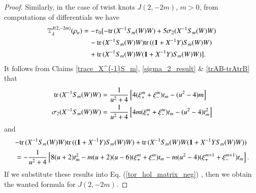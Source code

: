\documentclass[a4paper]{amsart}
\theoremstyle{plain}
\theoremstyle{definition}
\theoremstyle{remark}
\newtheorem{remark}{Remark}%
\newcommand{\I}{\mathbf{1}}
\newcommand{\trace}{{\rm tr}\,}
\begin{document}
\begin{proof}
Similarly, in the case of twist knots $J(2, -2m)$, $m>0$, from computations of differentials we have 
\begin{align}
{\mathbb T}^{J(2, -2m)}_{\lambda}(\rho_u)
&=
-\tau_0[
-\trace(X^{-1}S_m(W)W)+5\sigma_2(X^{-1}S_m(W)W) \label{tor_hol_matrix_neg}\\
& \quad
-\trace(X^{-1}S_m(W)W) \trace((\I+X^{-1}Y)S_m(W)W) \nonumber \\
&\quad
+\trace(X^{-1}S_m(W)W(\I+X^{-1}Y)S_m(W)W) ] \nonumber.
\end{align}
It follows from Claims \ref{trace_X^{-1}S_m}, \ref{sigma_2_result} \& \ref{trAB-trAtrB} that
%
\begin{align*}
\trace(X^{-1}S_m(W)W)
&=
\frac{1}{u^2+4}
\left[
4(\xi_{+}^m + \xi_{-}^m)t_m - (u^2-4)m
\right] \\
\sigma_2(X^{-1}S_m(W)W) 
&=
\frac{1}{u^2+4}
\left[
4m(\xi_{+}^m + \xi_{-}^m)t_m - (u^2 - 4)t^2_m
\right]
\end{align*}
and 
\begin{align*}
\lefteqn{
-\trace(X^{-1}S_m(W)W)\trace((\I+X^{-1}Y)S_m(W)W)
+\trace(X^{-1}S_m(W)W(\I+X^{-1}YS_m(W)W))
}& \\
&=
-\frac{1}{u^2+4}
\left[
8(u+2)t^2_m 
-m(u+2)(u-6)(\xi_{+}^m + \xi_{-}^m)t_m
-m(u^2-4)(\xi_{+}^{m+1} + \xi_{-}^{m+1})t_m
\right].
\end{align*}
If we substitute these results into Eq. (\ref{tor_hol_matrix_neg}) , then
we obtain the wanted formula for $J(2, -2m)$.
\end{proof}



\end{document}
